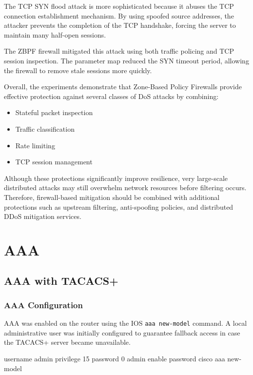 \documentclass[12pt]{article}
\begin{document}
The TCP SYN flood attack is more sophisticated because it abuses the TCP connection establishment mechanism.
By using spoofed source addresses, the attacker prevents the completion of the TCP handshake,
forcing the server to maintain many half-open sessions.

The ZBPF firewall mitigated this attack using both traffic policing and TCP session inspection.
The parameter map reduced the SYN timeout period, allowing the firewall to remove stale sessions more quickly.

Overall, the experiments demonstrate that Zone-Based Policy Firewalls provide effective protection
against several classes of DoS attacks by combining:

\begin{itemize}
    \item Stateful packet inspection
    \item Traffic classification
    \item Rate limiting
    \item TCP session management
\end{itemize}

Although these protections significantly improve resilience,
very large-scale distributed attacks may still overwhelm network resources before filtering occurs.
Therefore, firewall-based mitigation should be combined with additional protections
such as upstream filtering, anti-spoofing policies, and distributed DDoS mitigation services.

\newpage

\section{AAA}

\subsection{AAA with TACACS+}

\subsubsection{AAA Configuration}

AAA was enabled on the router using the IOS
\texttt{aaa new-model} command.
A local administrative user was initially configured
to guarantee fallback access in case the TACACS+
server became unavailable.

\begin{configbox}
username admin privilege 15 password 0 admin
enable password cisco
aaa new-model
\end{configbox}
\end{document}
